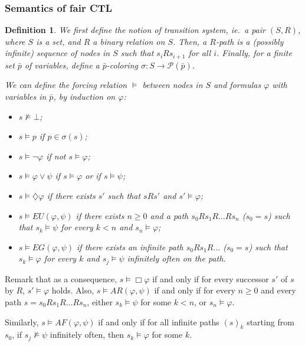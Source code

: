\documentclass[11pt]{article}
\newcommand{\dia}{{\diamondsuit}}
\newtheorem*{definition}{Definition}
\begin{document}
\subsubsection*{Semantics of fair CTL}\label{subsec:sem_CTLf}
\begin{definition}\label{forcing_rel_CTLf}
    We first define the notion of \emph{transition system}, ie.\ a pair $(S,R)$, where $S$ is a set, and $R$ a binary relation on $S$. Then, a \emph{$R$-path} is a (possibly infinite) sequence of nodes in $S$ such that $s_i R s_{i+1}$ for all $i$. Finally, for a finite set $\bar{p}$ of variables, define a \emph{$\bar{p}$-coloring} $\sigma : S \to \mathcal{P}(\bar{p})$.

    We can define the forcing relation $\models$ between nodes in $S$ and formulas $\varphi$ with variables in $\bar{p}$, by induction on $\varphi$:
    \begin{itemize}
        \setlength\itemsep{0em}
        \item[-] $s\not\models \bot$;
        \item[-] $s \models p$ if $p \in \sigma(s)$;
        \item[-] $s \models \neg\varphi$ if not $s \models \varphi$;
        \item[-] $s \models \varphi \vee \psi$ if $s\models \varphi$ or if $s\models \psi$;
        \item[-] $s\models \dia\varphi$ if there exists $s'$ such that $sRs'$ and $s'\models \varphi$;
        \item[-] $s\models EU(\varphi,\psi)$ if there exists $n\geq 0$ and a path $s_0Rs_1R\ldots Rs_n$ ($s_0=s$) such that $s_k\models\psi$ for every $k<n$ and $s_n\models\varphi$;
        \item[-] $s\models EG(\varphi,\psi)$ if there exists an infinite path $s_0Rs_1R\ldots $ ($s_0=s$) such that $s_k\models\varphi$ for every $k$ and $s_j\models\psi$ infinitely often on the path.       
    \end{itemize}

\end{definition}

Remark that as a consequence, $s\models\Box\varphi$ if and only if for every successor $s'$ of $s$ by $R$, $s'\models\varphi$ holds.
Also, $s\models AR(\varphi,\psi)$ if and only if for every $n\geq 0$ and every path $s=s_0Rs_1R\ldots Rs_n$, either $s_k\models\psi$ for some $k<n$, or $s_n\models\varphi$.

Similarly, $s\models AF(\varphi,\psi)$ if and only if for all infinite paths ${(s)}_k$ starting from $s_0$, if $s_j\not\models\psi$ infinitely often, then $s_k\models\varphi$ for some $k$.
\end{document}
